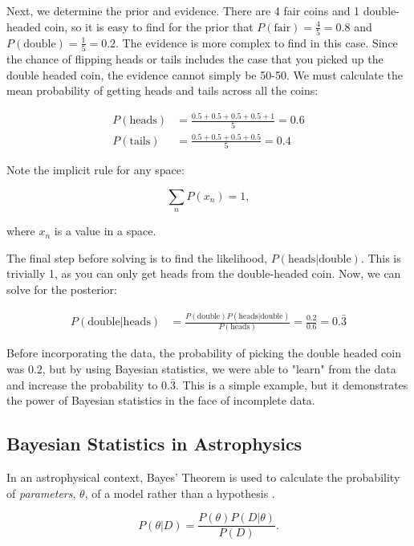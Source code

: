 \documentclass[preprint,longauthor]{aastex631}
\numberwithin{equation}{section}
\begin{document}
Next, we determine the prior and evidence. There are 4 fair coins and 1 double-headed coin, so it is easy to find for the prior that $P(\text{fair}) = \frac{4}{5} = 0.8$ and $P(\text{double}) = \frac{1}{5} = 0.2$. The evidence is more complex to find in this case. Since the chance of flipping heads or tails includes the case that you picked up the double headed coin, the evidence cannot simply be 50-50. We must calculate the mean probability of getting heads and tails across all the coins:

\begin{align*}
  P(\text{heads}) &= \frac{0.5+0.5+0.5+0.5+1}{5} = 0.6 \\
  P(\text{tails}) &= \frac{0.5+0.5+0.5+0.5}{5} = 0.4
\end{align*}

Note the implicit rule for any space:

\begin{equation}
  \sum_n P(x_n) = 1,
\end{equation}

where $x_n$ is a value in a space.

The final step before solving is to find the likelihood, $P(\text{heads}|\text{double})$. This is trivially 1, as you can only get heads from the double-headed coin. Now, we can solve for the posterior:

\begin{align*}
  P(\text{double}|\text{heads}) &= \frac{P(\text{double})P(\text{heads}|\text{double})}{P(\text{heads})} = \frac{0.2}{0.6} = \boxed{0.\bar{3}}
\end{align*}

Before incorporating the data, the probability of picking the double headed coin was $0.2$, but by using Bayesian statistics, we were able to "learn" from the data and increase the probability to $0.\bar{3}$. This is a simple example, but it demonstrates the power of Bayesian statistics in the face of incomplete data.

\subsection{Bayesian Statistics in Astrophysics}

In an astrophysical context, Bayes' Theorem is used to calculate the probability of \textit{parameters}, $\theta$, of a model rather than a hypothesis \citep{brewer1BayesianInference2018}.

\begin{equation}
  P(\theta|D) = \frac{P(\theta)P(D|\theta)}{P(D)}.
\end{equation}
\end{document}
